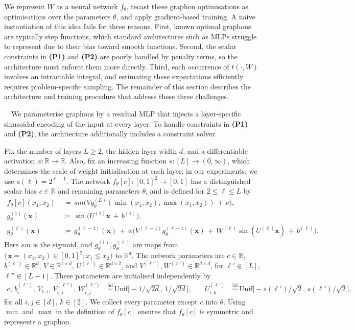 \documentclass[11pt]{article}
\theoremstyle{plain}
\theoremstyle{definition}
\theoremstyle{remark}
\newcommand*{\R}{\mathbb{R}}
\begin{document}
We represent $W$ as a neural network $f_\theta$, recast these graphon optimisations as optimisations over the parameters $\theta$, and apply gradient-based training. A naive instantiation of this idea fails for three reasons. First, known optimal graphons are typically step functions, which standard architectures such as MLPs struggle to represent due to their bias toward smooth functions. Second, the scalar constraints in \textbf{(P1)} and \textbf{(P2)} are poorly handled by penalty terms, so the architecture must enforce them more directly. Third, each occurrence of $t(\cdot, W)$ involves an intractable integral, and estimating these expectations efficiently requires problem-specific sampling. The remainder of this section describes the architecture and training procedure that address these three challenges.

\ $\,$
We parameterise graphons by a residual MLP that injects a layer-specific sinusoidal encoding of the input at every layer. To handle constraints in \textbf{(P1)} and \textbf{(P2)}, the architecture additionally includes a constraint solver.

Fix the number of layers $L \ge 2$, the hidden-layer width $d$, and a differentiable activation $\phi : \R \to \R$. Also, fix an increasing function $s : [L] \to (0, \infty)$, which determines the scale of weight initialisation at each layer; in our experiments, we use $s(\ell) = 2^{\ell-1}$. The network $f_\theta[c] : [0,1]^2 \to [0,1]$ has a distinguished scalar bias $c \in \R$ and remaining parameters $\theta$, and is defined for $2 \le \ell \le L$ by
\begin{align*}
f_{\theta}[c](x_1, x_2) & \,\coloneqq\, \mathit{sm}\bigl(V g^{(L)}_\theta(\min(x_1, x_2), \max(x_1, x_2)) \,+\, c\bigr),
\\
g^{(1)}_\theta(\mathbf{x}) & \,\coloneqq\, \sin\bigl(U^{(1)} \mathbf{x} \,+\, b^{(1)}\bigr),
\\
g^{(\ell)}_\theta(\mathbf{x}) & \,\coloneqq\, g_\theta^{(\ell-1)}(\mathbf{x}) \,+\, \phi\bigl(V^{(\ell-1)} g_\theta^{(\ell-1)}(\mathbf{x}) \,+\, W^{(\ell)} \sin(U^{(\ell)} \mathbf{x}) \,+\, b^{(\ell)}\bigr).
\end{align*}
Here $\mathit{sm}$ is the sigmoid, and $g^{(1)}_\theta, g^{(\ell)}_\theta$ are maps from $\{\mathbf{x} = (x_1, x_2) \in [0,1]^2 : x_1 \le x_2\}$ to $\R^d$. The network parameters are
$c \in \R$, $b^{(\ell')} \in \R^d$, $V \in \R^{1 \times d}$, $U^{(\ell')} \in \R^{d \times 2}$, and $V^{(\ell'')}, W^{(\ell')} \in \R^{d \times d}$, for $\ell' \in [L]$, $\ell'' \in [L-1]$. These parameters are initialised independently by
\begin{align*}
c,\, b^{(\ell')}_i,\, V_{1,i},\, V^{(\ell'')}_{i,j},\, W^{(\ell')}_{i,j}
&\,\stackrel{\mathrm{iid}}{\sim}\, \mathrm{Unif}\bigl[-1/\sqrt{2d},\, 1/\sqrt{2d}\bigr],
&
\quad
U^{(\ell')}_{i,k}
&\,\stackrel{\mathrm{iid}}{\sim}\, \mathrm{Unif}\bigl[-s(\ell')/\sqrt{2},\, s(\ell')/\sqrt{2}\bigr],
\end{align*}
for all $i, j \in [d]$, $k \in [2]$. We collect every parameter except $c$ into $\theta$. Using $\min$ and $\max$ in the definition of $f_\theta[c]$ ensures that $f_\theta[c]$ is symmetric and represents a graphon.
\end{document}
